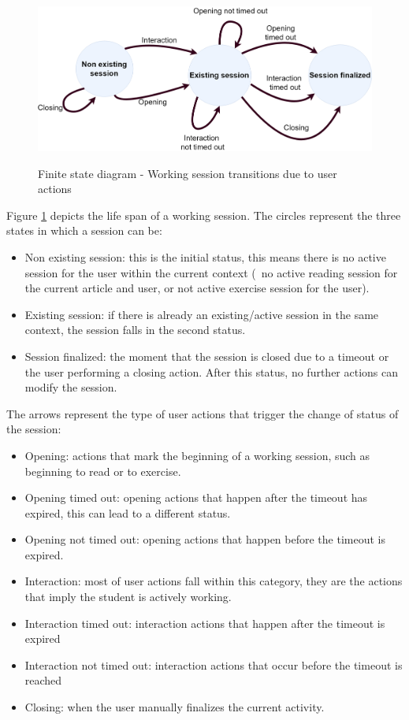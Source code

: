 \begin{figure}[bth]
	{\includegraphics[width=1\linewidth]{gfx/Finite_state_machine_diagramv2}} \quad
	\caption[Finite state diagram - Working session transitions due to user actions]{Finite state diagram - Working session transitions due to user actions}\label{fig:markov_diagram}
\end{figure}

Figure \ref{fig:markov_diagram} depicts the life span of a working session.
The circles represent the three states in which a session can be:
\begin{itemize}
	\item Non existing session: this is the initial status, this means there is no active session for the user within the current context (\Ie\ no active reading session for the current article and user, or not active exercise session for the user). 
	\item Existing session: if there is already an existing/active session in the same context, the session falls in the second status.
	\item Session finalized: the moment that the session is closed due to a timeout or the user performing a closing action. After this status, no further actions can modify the session.
\end{itemize}

The arrows represent the type of user actions that trigger the change of status of the session:
\begin{itemize}
	\item Opening: actions that mark the beginning of a working session, such as beginning to read or to exercise.
	\item Opening timed out: opening actions that happen after the timeout has expired, this can lead to a different status.
	\item Opening not timed out: opening actions that happen before the timeout is expired.
	\item Interaction: most of user actions fall within this category, they are the actions that imply the student is actively working.
	\item Interaction timed out: interaction actions that happen after the timeout is expired
	\item Interaction not timed out: interaction actions that occur before the timeout is reached
	\item Closing: when the user manually finalizes the current activity.
\end{itemize}


